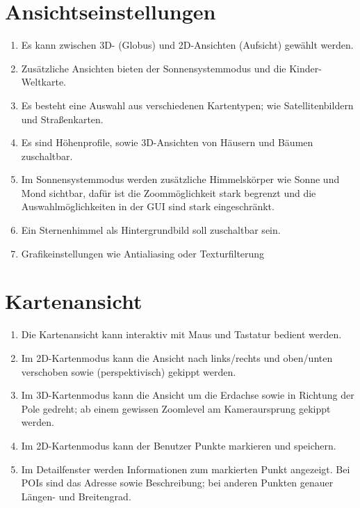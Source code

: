 \documentclass[10pt]{scrreprt}
\newcommand{\ziel}[1]{{\fontsize{9.5}{11}\textsf{/#1/}}}
\newcommand{\ziellabel}{Z}
\newcommand{\muss}{\renewcommand{\labelenumi}{\textbf{\ziel{\ziellabel\numprint{\theenumi}0}}}}
\newcommand{\wunsch}{\renewcommand{\labelenumi}{\textbf{\ziel{\ziellabel\numprint{\theenumi}0W}}}}
\begin{document}
\section{Ansichtseinstellungen}
\begin{enumerate}[leftmargin=2.2cm,resume]
\item Es kann zwischen 3D- (Globus) und 2D-Ansichten (Aufsicht) gewählt werden.
\wunsch
\item Zusätzliche Ansichten bieten der Sonnensystemmodus und die Kinder-Weltkarte.
\muss
\item Es besteht eine Auswahl aus verschiedenen Kartentypen; wie Satellitenbildern und Straßenkarten.
\wunsch
\item Es sind Höhenprofile, sowie 3D-Ansichten von Häusern und 
Bäumen zuschaltbar.
\item Im Sonnensystemmodus werden zusätzliche Himmelskörper wie Sonne und Mond sichtbar, dafür ist die Zoommöglichkeit stark begrenzt und die Auswahlmöglichkeiten in der GUI sind stark eingeschränkt.
\item Ein Sternenhimmel als Hintergrundbild soll zuschaltbar sein.
\item Grafikeinstellungen wie Antialiasing oder Texturfilterung
\end{enumerate}

\section{Kartenansicht}
\begin{enumerate}[leftmargin=2.2cm,resume]
\item Die Kartenansicht kann interaktiv mit Maus und Tastatur bedient werden.
\item Im 2D-Kartenmodus kann die Ansicht nach links/rechts und oben/unten verschoben sowie (perspektivisch) gekippt werden. 
\item Im 3D-Kartenmodus kann die Ansicht um die Erdachse sowie in Richtung der Pole gedreht; ab einem gewissen Zoomlevel am Kameraursprung gekippt werden.
\wunsch
\item Im 2D-Kartenmodus kann der Benutzer Punkte markieren und speichern.
\muss
\item Im Detailfenster werden Informationen zum markierten Punkt angezeigt. Bei POIs sind das Adresse sowie Beschreibung; bei anderen Punkten genauer Längen- und Breitengrad.
\end{enumerate}
\end{document}
